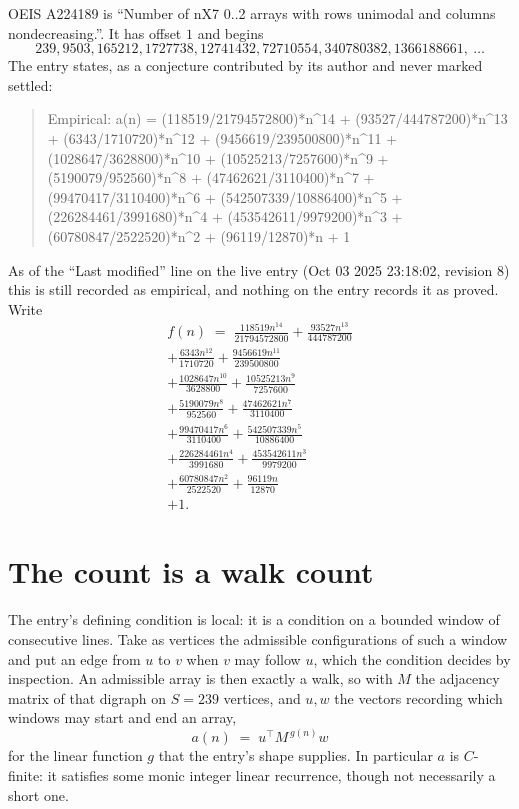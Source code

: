 \documentclass[11pt,a4paper]{article}
\theoremstyle{plain}
\theoremstyle{definition}
\begin{document}
OEIS A224189 is ``Number of nX7 0..2 arrays with rows unimodal and columns nondecreasing.''. It has offset $1$ and begins
\[
239, 9503, 165212, 1727738, 12741432, 72710554, 340780382, 1366188661,\ \dots
\]
The entry states, as a conjecture contributed by its author and never marked settled:
\begin{quote}\raggedright\small
Empirical: a(n) = (118519/21794572800)*n\^{}14 + (93527/444787200)*n\^{}13 + (6343/1710720)*n\^{}12 + (9456619/239500800)*n\^{}11 + (1028647/3628800)*n\^{}10 + (10525213/7257600)*n\^{}9 + (5190079/952560)*n\^{}8 + (47462621/3110400)*n\^{}7 + (99470417/3110400)*n\^{}6 + (542507339/10886400)*n\^{}5 + (226284461/3991680)*n\^{}4 + (453542611/9979200)*n\^{}3 + (60780847/2522520)*n\^{}2 + (96119/12870)*n + 1
\end{quote}
As of the ``Last modified'' line on the live entry (Oct 03 2025 23:18:02, revision 8) this is still
recorded as empirical, and nothing on the entry records it as proved. Write
\begin{multline*}
f(n)\;=\;\frac{118519 n^{14}}{21794572800} + \frac{93527 n^{13}}{444787200} \\
+ \frac{6343 n^{12}}{1710720} + \frac{9456619 n^{11}}{239500800} \\
+ \frac{1028647 n^{10}}{3628800} + \frac{10525213 n^{9}}{7257600} \\
+ \frac{5190079 n^{8}}{952560} + \frac{47462621 n^{7}}{3110400} \\
+ \frac{99470417 n^{6}}{3110400} + \frac{542507339 n^{5}}{10886400} \\
+ \frac{226284461 n^{4}}{3991680} + \frac{453542611 n^{3}}{9979200} \\
+ \frac{60780847 n^{2}}{2522520} + \frac{96119 n}{12870} \\
+ 1.
\end{multline*}

\section{The count is a walk count}

The entry's defining condition is local: it is a condition on a bounded window of consecutive lines. Take as vertices the
admissible configurations of such a window and put an edge from $u$ to $v$ when $v$ may
follow $u$, which the condition decides by inspection. An admissible array is then exactly a
walk, so with $M$ the adjacency matrix of that digraph on $S=239$ vertices, and $u,w$ the
vectors recording which windows may start and end an array,
\[
a(n)\;=\;u^{\!\top}M^{\,g(n)}w
\]
for the linear function $g$ that the entry's shape supplies. In particular $a$ is
$C$-finite: it satisfies some monic integer linear recurrence, though not necessarily a short
one.
\end{document}
